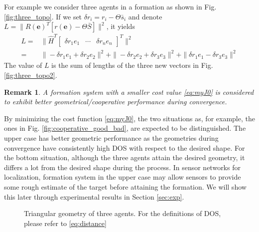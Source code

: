 \documentclass[times]{rncauth}
\newtheorem{rem}{Remark}[section]
\begin{document}
For example  we consider three agents in a formation as shown in Fig.
\ref{fig:three_topo}. If we set $\delta
r_i=r_i-\Theta\bar{s}_i$ and denote
$L=\|R(\mathbf{e})^T[r(\mathbf{e})-\Theta\bar{S}]\|^2$, it yields
\begin{align}
   L=&\|\hat{H}^T\begin{bmatrix}
    \delta r_1 e_1 &\cdots & \delta r_n e_n
  \end{bmatrix}^T\|^2\nonumber\\
  =&\|-\delta r_1 e_1+\delta r_2 e_2\|^2+\|-\delta r_2 e_2+\delta r_3
e_3\|^2+\|\delta r_1 e_1-\delta r_3 e_3\|^2
\end{align}
The value of $L$ is the sum of  lengths of the three new vectors in Fig. \ref{fig:three_topo2}.

\begin{rem}
A formation system with a smaller cost value \eqref{eq:myJ0} is considered to
exhibit better geometrical/cooperative performance during convergence.
\end{rem}


By minimizing the cost function \eqref{eq:myJ0}, the two situations as, for example, the ones in Fig.
\ref{fig:cooperative_good_bad}, are expected to be distinguished. The upper case has better geometric
performance as the geometries during convergence have consistently high DOS
 with respect to the desired shape. For the bottom
situation, although the three agents attain the desired geometry, it
differs a lot from the desired shape during the process. In sensor
networks for localization, formation system in the upper case may
allow sensors to provide some rough estimate of the target before
attaining the formation. We will show this later through
experimental results in Section \ref{sec:exp}.
\begin{figure}
\caption{Triangular geometry of three agents. For the definitions of DOS, please refer to \eqref{eq:distance}}\label{fig:unknown}
\end{figure}
\end{document}
